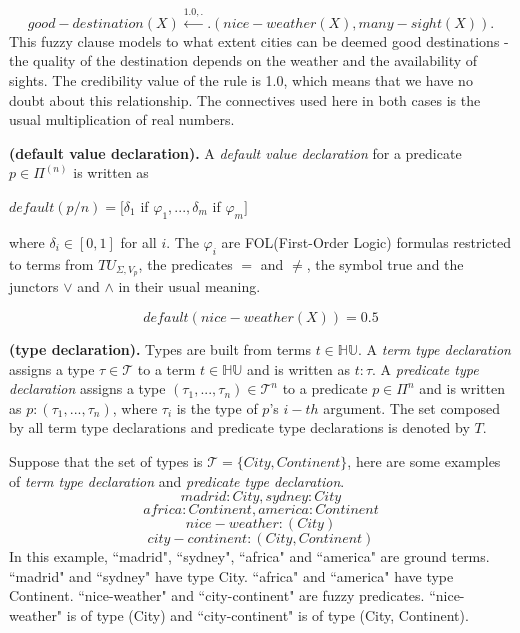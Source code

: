 \begin{ex}
\label{ex:FuzzyClauses}
\[good-destination(X) \stackrel{1.0,.}{\leftarrow} .(nice-weather(X),many-sight(X)).\]
This fuzzy clause models to what extent cities can be deemed good destinations - the quality of the destination depends on the weather and the availability of sights. The credibility value of the rule is 1.0, which means that we have no doubt about this relationship. The connectives used here in both cases is the usual multiplication of real numbers.
\end{ex}

\begin{defin}\textbf{(default value declaration).}
\label{def:DefaultValueDecl}
A \textit{default value declaration} for a predicate $p \in \Pi^{(n)}$ is written as
\begin{center}
 $default(p/n)= [\delta_1$ if $\varphi_1, ..., \delta_m$ if $\varphi_m]$
\end{center}
where $\delta_i\in[0,1]$ for all $i$. The $\varphi_i$ are FOL(First-Order Logic) formulas restricted to terms from $TU_{\Sigma,V_p}$, the predicates $=$ and $\neq$, the symbol true and the junctors $\vee$ and $\wedge$ in their usual meaning.
\end{defin}

\begin{ex}
\label{ex:DefaultValueDecl}
 \[default(nice-weather(X)) = 0.5\]
\end{ex}

\begin{defin}\textbf{(type declaration).}
\label{def:TypeDecl}
Types are built from terms $t \in \mathbb{HU}$. A \textit{term type declaration} assigns a type $\tau \in \mathcal{T}$ to a term $t \in \mathbb{HU}$ and is written as $t : \tau$. A \textit{predicate type declaration} assigns a type $(\tau_1, ..., \tau_n) \in \mathcal{T}^n$ to a predicate $p \in \Pi^n$ and is written as $p : (\tau_1, ..., \tau_n)$, where $\tau_i$ is the type of $p$'s $i-th$ argument. The set composed by all term type declarations and predicate type declarations is denoted by $T$.
\end{defin}

\begin{ex}
\label{ex:TypeDecl}
Suppose that the set of types is $\mathcal{T}=\{City,Continent\}$, here are some examples of  \textit{term type declaration} and \textit{predicate type declaration}.
\[madrid : City, sydney : City\]
\[africa : Continent, america : Continent\]
\[nice-weather : (City)\]
\[city-continent : (City, Continent)\]
In this example, ``madrid", ``sydney", ``africa" and ``america" are ground terms. ``madrid" and ``sydney" have type City. ``africa" and ``america" have type Continent. ``nice-weather" and ``city-continent" are fuzzy predicates. ``nice-weather" is of type (City) and ``city-continent" is of type (City, Continent).
\end{ex}

